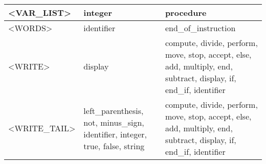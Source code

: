 \begin{tabular}{|l|l|l|}
<VAR\_LIST>           &   integer                                         &   procedure                                        \\ \hline
<WORDS>              &   identifier                                      &   end\_of\_instruction                               \\ \hline
<WRITE>              &   display                                         &   compute, divide, perform, move, stop, accept, else, add, multiply, end, subtract, display, if, end\_if, identifier \\ \hline
<WRITE\_TAIL>         &   left\_parenthesis, not, minus\_sign, identifier, integer, true, false, string&   compute, divide, perform, move, stop, accept, else, add, multiply, end, subtract, display, if, end\_if, identifier \\ \hline

\end{tabular}